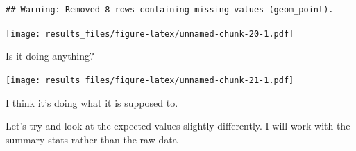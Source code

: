 \documentclass[]{article}
\newenvironment{Shaded}{\begin{snugshade}}{\end{snugshade}}
\newcommand{\DataTypeTok}[1]{\textcolor[rgb]{0.13,0.29,0.53}{#1}}
\newcommand{\DecValTok}[1]{\textcolor[rgb]{0.00,0.00,0.81}{#1}}
\newcommand{\KeywordTok}[1]{\textcolor[rgb]{0.13,0.29,0.53}{\textbf{#1}}}
\newcommand{\NormalTok}[1]{#1}
\newcommand{\OperatorTok}[1]{\textcolor[rgb]{0.81,0.36,0.00}{\textbf{#1}}}
\newcommand{\StringTok}[1]{\textcolor[rgb]{0.31,0.60,0.02}{#1}}
\begin{document}
\begin{verbatim}
## Warning: Removed 8 rows containing missing values (geom_point).
\end{verbatim}

\texttt{[image: results\_files/figure-latex/unnamed-chunk-20-1.pdf]}

Is it doing anything?

\begin{Shaded}
\end{Shaded}

\texttt{[image: results\_files/figure-latex/unnamed-chunk-21-1.pdf]}

I think it's doing what it is supposed to.

Let's try and look at the expected values slightly differently. I will
work with the summary stats rather than the raw data
\end{document}
